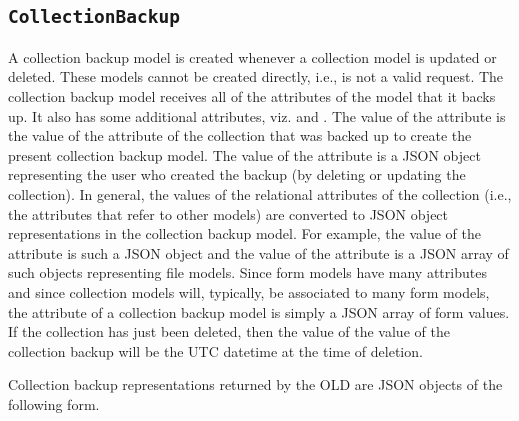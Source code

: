\documentclass[letterpaper,10pt,english]{sphinxmanual}
\begin{document}
\subsection{\texttt{CollectionBackup}}
\label{datastructure:collection-backup-data-structure}\label{datastructure:collectionbackup}
A collection backup model is created whenever a collection model is updated or
deleted.  These models cannot be created directly, i.e.,
 is not a valid request.  The collection backup model
receives all of the attributes of the model that it backs up.  It also has some
additional attributes, viz.  and .  The value of
the  attribute is the value of the  attribute of the
collection that was backed up to create the present collection backup model.
The value of the  attribute is a JSON object representing the user
who created the backup (by deleting or updating the collection).  In general,
the values of the relational attributes of the collection (i.e., the attributes
that refer to other models) are converted to JSON object representations in the
collection backup model.  For example, the value of the  attribute is
such a JSON object and the value of the  attribute is a JSON array of
such objects representing file models.  Since form models have many attributes
and since collection models will, typically, be associated to many form models,
the  attribute of a collection backup model is simply a JSON array of
form  values.  If the collection has just been deleted, then the value of
the  value of the collection backup will be the UTC
datetime at the time of deletion.

Collection backup representations returned by the OLD are JSON objects of the
following form.
\end{document}
